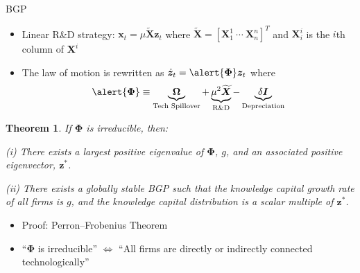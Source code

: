 \documentclass[
  10pt,
  aspectratio=169,   %
]{beamer}
\theoremstyle{plain}
\newtheorem*{theorem*}{Theorem}
\begin{document}
\begin{frame}{BGP}
  \begin{itemize}
    \label{bgp}
    \item Linear R\&D strategy: $\bm{x}_{t}=\mu\bm{\widetilde{X}}\bm{z}_{t}$ where $\bm{\widetilde{X}}= \left[\bm{X}_{1}^{1} \ \cdots \ \bm{X}_{n}^{n}\right]^{T}$ and $\bm{X}_{i}^{i}$ is the $i$th column of $\bm{X}^{i}$
    \item The law of motion is rewritten as $\dot{\bm{z}}_{t}=\alert{\bm{\Phi}}\bm{z}_{t}$
          where
          \[
            \alert{\bm{\Phi}}\equiv\underbrace{\bm{\Omega}}_{\text{Tech Spillover}}+\underbrace{\mu^{2}\bm{\widetilde{X}}}_{\text{R\&D}} -\underbrace{\delta\bm{I}}_{\text{Depreciation}}
          \]
          \vspace{-7mm}
  \end{itemize}\pause
  \begin{theorem*}
    If \alert{$\bm{\Phi}$} is irreducible, then:

    (i) There exists a largest positive eigenvalue of \alert{$\bm{\Phi}$}, $g$, and
    an associated positive eigenvector, $\bm{z}^{*}$.

    (ii) There exists a globally stable BGP such that the knowledge capital
    growth rate of all firms is $g$, and the knowledge capital distribution
    is a scalar multiple of $\bm{z}^{*}$.
  \end{theorem*}
  \begin{itemize}
    \item Proof: Perron--Frobenius Theorem
    \item ``\alert{$\bm{\Phi}$} is irreducible'' $\Longleftrightarrow$ ``All firms are
          directly or indirectly connected technologically''
  \end{itemize}
  \hyperlink{symmetric}{}
\end{frame}
\end{document}
